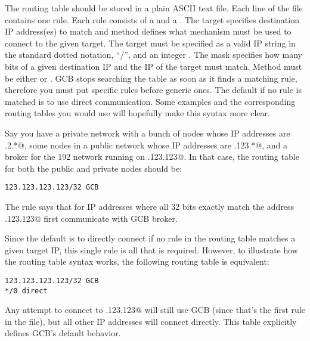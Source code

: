 The routing table should be stored in a plain ASCII text file.
Each line of the file contains one rule.
Each rule consists of a  and a .
The target specifies destination IP address(es) to match and method
defines what mechanism must be used to connect to the given target.
The target must be specified as a valid IP string in the standard
dotted notation, ``/'', and an integer .
The mask specifies how many bits of a given destination IP and the IP
of the target must match.
Method must be either \verb@GCB@ or \verb@direct@.
GCB stops searching the table as soon as it finds a matching rule,
therefore you must put specific rules before generic ones.
The default if no rule is matched is to use direct communication.
Some examples and the corresponding routing tables you would use will
hopefully make this syntax more clear.



Say you have a private network with a bunch of nodes whose IP
addresses are .2.*@, some nodes in a public network 
whose IP addresses are .123.*@, and a broker for the 192
network running on .123.123@.
In that case, the routing table for both the public and private nodes
should be:

\begin{verbatim}
123.123.123.123/32 GCB
\end{verbatim}

The rule says that for IP addresses where all 32 bits exactly match
the address .123.123@ first communicate with GCB broker.

Since the default is to directly connect if no rule in the routing
table matches a given target IP, this single rule is all that is
required.
However, to illustrate how the routing table syntax works, the
following routing table is equivalent:

\begin{verbatim}
123.123.123.123/32 GCB
*/0 direct
\end{verbatim}

Any attempt to connect to .123.123@ will still use GCB
(since that's the first rule in the file), but all other IP addresses
will connect directly.
This table explicitly defines GCB's default behavior.


